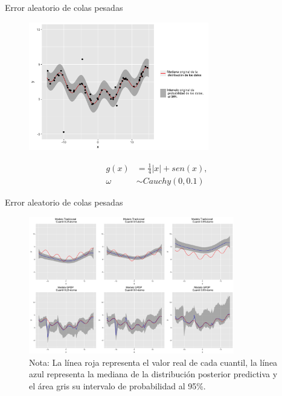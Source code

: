 \documentclass{beamer}
\begin{document}
\begin{frame}{Error aleatorio de colas pesadas}
    \begin{figure}[H]
        	\centering
        	\includegraphics[width=0.7\textwidth]{Figures/Simulation/heavy_tails/sample.png}
        	\label{sample_classic}
    \end{figure}
    \begin{equation*}
    \begin{aligned}
        g(x) &= \frac{1}{4}|x| + sen(x),\\
        \omega &\sim Cauchy(0,0.1)
    \end{aligned}
    \end{equation*}
\end{frame}

\begin{frame}{Error aleatorio de colas pesadas}
    \begin{figure}[H]
        \centering
        \includegraphics[width=0.8\textwidth]{Figures/Simulation/heavy_tails/presentation.png}
        \captionsetup{singlelinecheck=off,font=footnotesize}
        \caption*{Nota: La l\'inea roja representa el valor real de cada cuantil, la l\'inea azul representa la mediana de la distribuci\'on posterior predictiva y el \'area gris su intervalo de probabilidad al 95\%.}
    \end{figure}
\end{frame}
\end{document}
